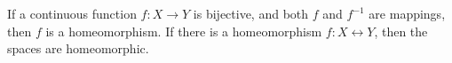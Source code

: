 If a continuous function $f: X \rightarrow Y$ is bijective, and both $f$ and $f^{-1}$ are mappings, then $f$ is a homeomorphism. If there is a homeomorphism $f: X \leftrightarrow Y$, then the spaces are homeomorphic.
